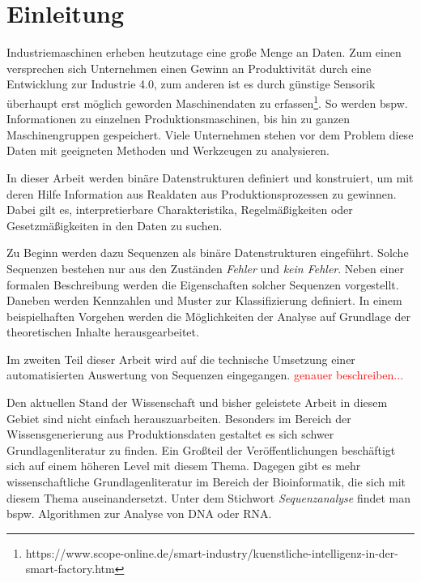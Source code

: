 \chapter{Einleitung}
\label{chp:introduction}
Industriemaschinen erheben heutzutage eine große Menge an Daten. Zum einen versprechen sich Unternehmen einen Gewinn an Produktivität durch eine Entwicklung zur Industrie 4.0, zum anderen ist es durch günstige Sensorik überhaupt erst möglich geworden Maschinendaten zu erfassen\footnote{https://www.scope-online.de/smart-industry/kuenstliche-intelligenz-in-der-smart-factory.htm}. So werden bspw. Informationen zu einzelnen Produktionsmaschinen, bis hin zu ganzen Maschinengruppen gespeichert. Viele Unternehmen stehen vor dem Problem diese Daten mit geeigneten Methoden und Werkzeugen zu analysieren.

In dieser Arbeit werden binäre Datenstrukturen definiert und konstruiert, um mit deren Hilfe Information aus Realdaten aus Produktionsprozessen zu gewinnen. Dabei gilt es, interpretierbare Charakteristika, Regelmäßigkeiten oder Gesetzmäßigkeiten in den Daten zu suchen. 

Zu Beginn werden dazu Sequenzen als binäre Datenstrukturen eingeführt. Solche Sequenzen bestehen nur aus den Zuständen \textit{Fehler} und \textit{kein Fehler}. Neben einer formalen Beschreibung werden die Eigenschaften solcher Sequenzen vorgestellt. Daneben werden Kennzahlen und Muster zur Klassifizierung definiert. In einem beispielhaften Vorgehen werden die Möglichkeiten der Analyse auf Grundlage der theoretischen Inhalte herausgearbeitet.

Im zweiten Teil dieser Arbeit wird auf die technische Umsetzung einer automatisierten Auswertung von Sequenzen eingegangen. \textcolor{red}{genauer beschreiben...}  

Den aktuellen Stand der Wissenschaft und bisher geleistete Arbeit in diesem Gebiet sind nicht einfach herauszuarbeiten. Besonders im Bereich der Wissensgenerierung aus Produktionsdaten gestaltet es sich schwer Grundlagenliteratur zu finden. Ein Großteil der Veröffentlichungen beschäftigt sich auf einem höheren Level mit diesem Thema. Dagegen gibt es mehr wissenschaftliche Grundlagenliteratur im Bereich der Bioinformatik, die sich mit diesem Thema auseinandersetzt. Unter dem Stichwort \textit{Sequenzanalyse} findet man bspw. Algorithmen zur Analyse von DNA oder RNA. 